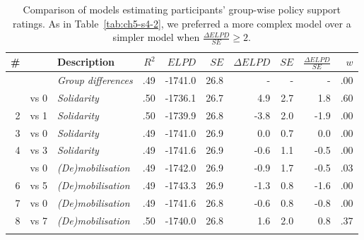 \documentclass[12pt, a4paper]{article}
\begin{document}
\begin{table}
\centering
{}
\caption[Model comparison for individual differences in policy support for Study 4]{Comparison of models estimating participants' group-wise policy support ratings. As in Table~\ref{tab:ch5-s4-2}, we preferred a more complex model over a simpler model when $\frac{\Delta\textit{ELPD}}{\textit{SE}} \geq 2$.}
\small	
\begin{tabularx}{\linewidth}{r@{~}rXrrrrrrr} \toprule
\# &  &  Description & $R^2$ & $\textit{ELPD}$ & $\textit{SE}$ & $\Delta\textit{ELPD}$ & $\textit{SE}$ & $\frac{\Delta\textit{ELPD}}{\textit{SE}}$ & $w$ \\ \midrule \addlinespace
0 &      & \textit{Group differences} & .49 & -1741.0 & 26.8 & - & - & - & .00 \\ \addlinespace
1 & vs 0 & \textit{Solidarity}       & .50 & -1736.1 & 26.7 &  4.9 & 2.7 & 1.8 & .60 \\
2 & vs 1 & \textit{Solidarity}       & .50 & -1739.9 & 26.8 &   -3.8 & 2.0 & -1.9 & .00 \\
3 & vs 0 & \textit{Solidarity}       & .49 & -1741.0 & 26.9 & 0.0 & 0.7 & 0.0 & .00 \\
4 & vs 3 & \textit{Solidarity}       & .49 & -1741.6 & 26.9 &  -0.6 & 1.1 & -0.5 & .00 \\ \addlinespace
5 & vs 0 & \textit{(De)mobilisation} & .49 & -1742.0 & 26.9 & -0.9 & 1.7 & -0.5 & .03 \\
6 & vs 5 & \textit{(De)mobilisation} & .49 & -1743.3 & 26.9 & -1.3 & 0.8 & -1.6 & .00\\
7 & vs 0 & \textit{(De)mobilisation} & .49 & -1741.6 & 26.8 & -0.6 & 0.8 & -0.8 & .00\\
8 & vs 7 & \textit{(De)mobilisation} & .50 & -1740.0 & 26.8 &  1.6 & 2.0 & 0.8 & .37 \\ \addlinespace \bottomrule
\end{tabularx}
\label{tab:ch5-s4-3}
\end{table}
\end{document}
